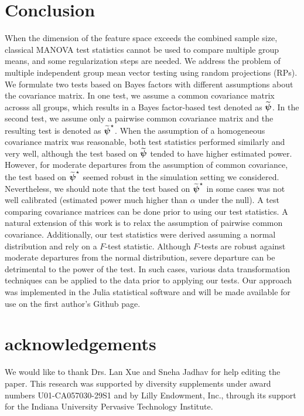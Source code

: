 \documentclass[alpha-refs]{wiley-article}
\theoremstyle{plain}%
\theoremstyle{definition}
\def\boldpsi{{\mbox{\boldmath $\psi$}}}
\begin{document}
\section{Conclusion} \label{sec:conclusion}
When the dimension of the feature space exceeds the combined sample size, classical MANOVA test statistics cannot be used to compare multiple group means, and some regularization steps are needed. We address the problem of multiple independent group mean vector testing using random projections (RPs). We formulate two tests based on Bayes factors with different assumptions about the covariance matrix. In one test, we assume a common covariance matrix acrosss all groups, which results in a Bayes factor-based test denoted as $\widetilde{\boldpsi}$. In the second test, we assume only a pairwise common covariance matrix and the resulting test is denoted as $\widetilde{\boldpsi}^{\star}$. When the assumption of a homogeneous covariance matrix was reasonable, both test statistics performed similarly and very well, although the test based on $\widetilde{\boldpsi}$ tended to have higher estimated power. However, for moderate departures from the assumption of common covariance, the test based on $\widetilde{\boldpsi}^{\star}$ seemed robust in the simulation setting we considered. Nevertheless, we should note that the test based on $\widetilde{\boldpsi}^{\star}$ in some cases was not well calibrated (estimated power much higher than $\alpha$ under the null). A test comparing covariance matrices can be done prior to using our test statistics.  A natural extension of this work is to relax the assumption of pairwise common covariance. Additionally, our test statistics were derived assuming a normal distribution and rely on a $F$-test statistic. Although $F$-tests are robust against moderate departures from the normal distribution, severe departure can be detrimental to the power of the test. In such cases, various data transformation techniques can be applied to the data prior to applying our tests. Our approach was implemented in the  \textsf{Julia} \cite{bezanson2012julia} statistical software and will be made available for use on the first author's Github page.   



\section*{acknowledgements}
We would like to thank Drs. Lan Xue and Sneha Jadhav for help editing the paper. This research was supported by diversity supplements under award numbers U01-CA057030-29S1 and by Lilly Endowment, Inc., through its support for the Indiana University Pervasive Technology Institute.
\end{document}
